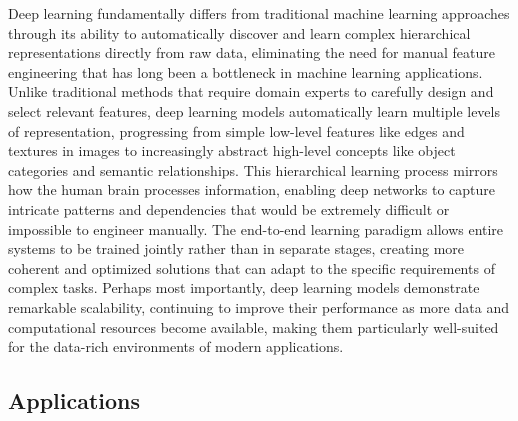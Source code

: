 Deep learning fundamentally differs from traditional machine learning approaches through its ability to automatically discover and learn complex hierarchical representations directly from raw data, eliminating the need for manual feature engineering that has long been a bottleneck in machine learning applications. Unlike traditional methods that require domain experts to carefully design and select relevant features, deep learning models automatically learn multiple levels of representation, progressing from simple low-level features like edges and textures in images to increasingly abstract high-level concepts like object categories and semantic relationships. This hierarchical learning process mirrors how the human brain processes information, enabling deep networks to capture intricate patterns and dependencies that would be extremely difficult or impossible to engineer manually. The end-to-end learning paradigm allows entire systems to be trained jointly rather than in separate stages, creating more coherent and optimized solutions that can adapt to the specific requirements of complex tasks. Perhaps most importantly, deep learning models demonstrate remarkable scalability, continuing to improve their performance as more data and computational resources become available, making them particularly well-suited for the data-rich environments of modern applications.

\subsection{Applications}

